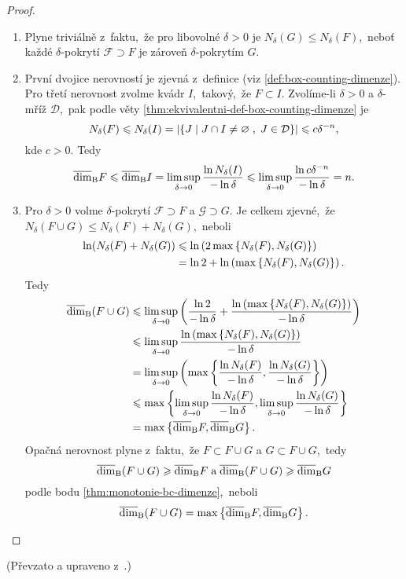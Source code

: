\begin{proof}
    \begin{enumerate}[label=\textit{(\roman*)}]
        \item Plyne triviálně z~faktu,~že pro libovolné $\delta>0$ je $N_\delta(G)\leqslant N_\delta(F)$,~neboť každé $\delta$-pokrytí $\mathcal{F}\supset F$ je zároveň $\delta$-pokrytím $G$.
        \item První dvojice nerovností je zjevná z~definice (viz \ref{def:box-counting-dimenze}). Pro třetí nerovnost zvolme kvádr $I$,~takový,~že $F\subset I$. Zvolíme-li $\delta>0$ a $\delta$-mříž $\mathcal{D}$,~pak podle věty \ref{thm:ekvivalentni-def-box-counting-dimenze} je
        \[N_\delta(F)\leqslant N_\delta(I)=\left|\left\{J\;\middle|\;J\cap I\neq\varnothing\;,\;J\in\mathcal{D}\right\}\right|\leqslant c\delta^{-n},\]
        kde $c>0$. Tedy
        \[\overline{\dim}_\textup{B}{F}\leqslant\overline{\dim}_\textup{B}{I}=\limsup_{\delta\to 0}\dfrac{\ln{N_\delta(I)}}{-\ln{\delta}}\leqslant\limsup_{\delta\to 0}\dfrac{\ln{c\delta^{-n}}}{-\ln{\delta}}=n.\]
        \item Pro $\delta>0$ volme $\delta$-pokrytí $\mathcal{F}\supset F$ a $\mathcal{G}\supset G$. Je celkem zjevné,~že $N_\delta(F\cup G)\leqslant N_\delta(F)+N_\delta(G)$,~neboli
        \begin{align*}
            \ln(N_\delta(F)+N_\delta(G))&\leqslant \ln\left(2\max\left\{N_\delta(F),N_\delta(G)\right\}\right)\\
            &=\ln{2}+\ln\left(\max\left\{N_\delta(F),N_\delta(G)\right\}\right).
        \end{align*}
        Tedy
        \begin{align*}
            \overline{\dim}_\textup{B}(F\cup G)&\leqslant\limsup_{\delta\to 0}\left(\dfrac{\ln{2}}{-\ln{\delta}}+\dfrac{\ln\left(\max\left\{N_\delta(F),N_\delta(G)\right\}\right)}{-\ln{\delta}}\right)\\
            &\leqslant\limsup_{\delta\to 0}\dfrac{\ln\left(\max\left\{N_\delta(F),N_\delta(G)\right\}\right)}{-\ln{\delta}}\\
            &=\limsup_{\delta\to 0}\left(\max\left\{\dfrac{\ln{N_\delta(F)}}{-\ln{\delta}},\dfrac{\ln{N_\delta(G)}}{-\ln{\delta}}\right\}\right)\\
            &\leqslant\max\left\{\limsup_{\delta\to 0}\dfrac{\ln{N_\delta(F)}}{-\ln{\delta}},\limsup_{\delta\to 0}\dfrac{\ln{N_\delta(G)}}{-\ln{\delta}}\right\}\\
            &=\max\left\{\overline{\dim}_\textup{B}{F},\overline{\dim}_\textup{B}{G}\right\}.
        \end{align*}
        Opačná nerovnost plyne z~faktu,~že $F\subset F\cup G$ a $G\subset F\cup G$,~tedy
        \[\overline{\dim}_\textup{B}(F\cup G)\geqslant\overline{\dim}_\textup{B}{F}\;\text{a}\;\overline{\dim}_\textup{B}(F\cup G)\geqslant\overline{\dim}_\textup{B}{G}\]
        podle bodu \ref{thm:monotonie-bc-dimenze},~neboli
        \[\overline{\dim}_\textup{B}(F\cup G)=\max\left\{\overline{\dim}_\textup{B}{F},\overline{\dim}_\textup{B}{G}\right\}.\]
    \end{enumerate}
\end{proof}
(Převzato a upraveno z~\citep[str. 35]{Falconer2014}.)

